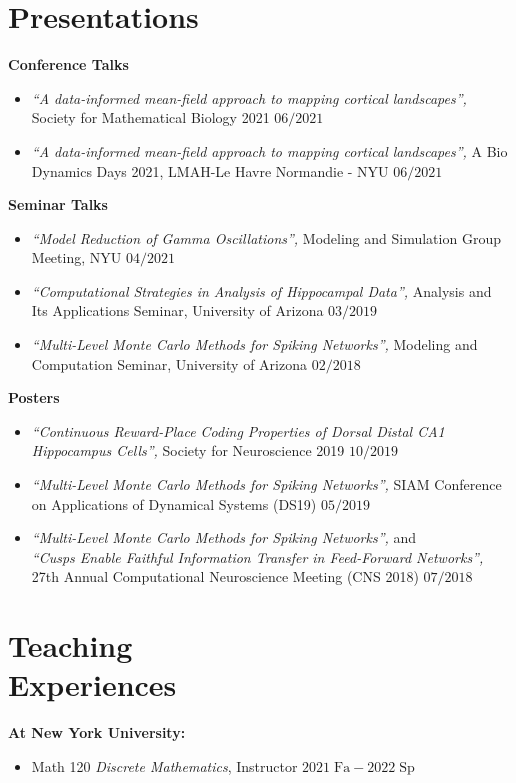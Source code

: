 \documentclass[margin, 11pt]{res} %
\begin{document}
\begin{resume}
\section{Presentations}
\label{Presentations}
{\bf Conference Talks}
\begin{itemize}
\item \textit{“A data-informed mean-field approach to mapping cortical landscapes”,} 
Society for Mathematical Biology 2021 \hfill $06/2021$
\item \textit{“A data-informed mean-field approach to mapping cortical landscapes”,} 
A Bio Dynamics Days 2021, LMAH-Le Havre Normandie - NYU \hfill $06/2021$
\end{itemize}

{\bf Seminar Talks}
\begin{itemize}
\item \textit{“Model Reduction of Gamma Oscillations”,} 
Modeling and Simulation Group Meeting, NYU \hfill $04/2021$
\item \textit{“Computational Strategies in Analysis of Hippocampal Data”,} 
Analysis and Its Applications Seminar, University of Arizona \hfill $03/2019$
\item \textit{“Multi-Level Monte Carlo Methods for Spiking Networks”,} 
Modeling and Computation Seminar, University of Arizona \hfill $02/2018$
\end{itemize}

{\bf Posters}
\begin{itemize}
\item \textit{“Continuous Reward-Place Coding Properties of Dorsal Distal CA1 Hippocampus Cells”,}
Society for Neuroscience 2019  \hfill $10/2019$
\item \textit{“Multi-Level Monte Carlo Methods for Spiking Networks”,} 
SIAM Conference on Applications of Dynamical Systems (DS19) \hfill $05/2019$
\item \textit{“Multi-Level Monte Carlo Methods for Spiking Networks”,} and \\
\textit{ “Cusps Enable Faithful Information Transfer in Feed-Forward Networks”,}
27th Annual Computational Neuroscience Meeting (CNS 2018) \hfill $07/2018$
\end{itemize}


\section{Teaching \\ Experiences}
{\bf At New York University:}
\begin{itemize}
\item Math 120 {\sl Discrete Mathematics}, Instructor \hfill $2021\;\mathrm{Fa}-2022\;\mathrm{Sp}$ 
\end{itemize}


\end{resume}
\end{document}
